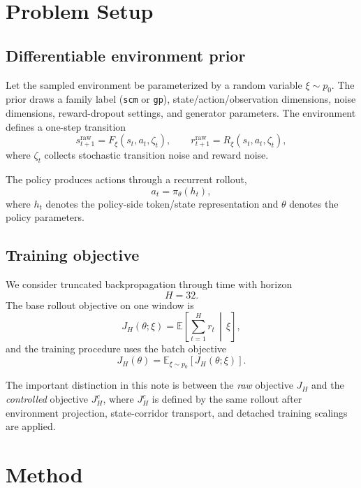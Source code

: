 \documentclass[11pt]{article}
\newcommand{\E}{\mathbb{E}}
\newcommand{\1}{\mathbf{1}}
\begin{document}
\section{Problem Setup}
\subsection{Differentiable environment prior}
Let the sampled environment be parameterized by a random variable $\xi \sim p_0$. The prior draws a family label (\texttt{scm} or \texttt{gp}), state/action/observation dimensions, noise dimensions, reward-dropout settings, and generator parameters. The environment defines a one-step transition
\begin{equation}
  s_{t+1}^{\mathrm{raw}} = F_{\xi}(s_t, a_t, \zeta_t), \qquad
  r_{t+1}^{\mathrm{raw}} = R_{\xi}(s_t, a_t, \zeta_t),
\end{equation}
where $\zeta_t$ collects stochastic transition noise and reward noise.

The policy produces actions through a recurrent rollout,
\begin{equation}
  a_t = \pi_{\theta}(h_t),
\end{equation}
where $h_t$ denotes the policy-side token/state representation and $\theta$ denotes the policy parameters.

\subsection{Training objective}
We consider truncated backpropagation through time with horizon
\begin{equation}
  H = 32.
\end{equation}
The base rollout objective on one window is
\begin{equation}
  J_H(\theta;\xi) = \E\!\left[\sum_{t=1}^{H} r_t \,\middle|\, \xi \right],
\end{equation}
and the training procedure uses the batch objective
\begin{equation}
  J_H(\theta) = \E_{\xi \sim p_0}[J_H(\theta;\xi)].
\end{equation}

The important distinction in this note is between the \emph{raw} objective $J_H$ and the \emph{controlled} objective $J_H^c$, where $J_H^c$ is defined by the same rollout after environment projection, state-corridor transport, and detached training scalings are applied.

\section{Method}
\end{document}
